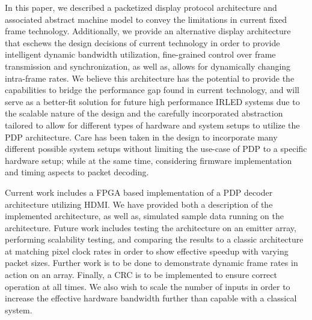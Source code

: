 \label{chap:conclusion}
In this paper, we described a packetized display protocol architecture and associated abstract machine model to convey the limitations in current fixed frame technology. Additionally, we provide an alternative display architecture that eschews the design decisions of current technology in order to provide intelligent dynamic bandwidth utilization, fine-grained control over frame transmission and synchronization, as well as, allows for dynamically changing intra-frame rates. We believe this architecture has the potential to provide the capabilities to bridge the performance gap found in current technology, and will serve as a better-fit solution for future high performance IRLED systems due to the scalable nature of the design and the carefully incorporated abstraction tailored to allow for different types of hardware and system setups to utilize the PDP architecture. Care has been taken in the design to incorporate many different possible system setups without limiting the use-case of PDP to a specific hardware setup; while at the same time, considering firmware implementation and timing aspects to packet decoding.

Current work includes a FPGA based implementation of a PDP decoder architecture utilizing HDMI. We have provided both a description of the implemented architecture, as well as, simulated sample data running on the architecture. Future work includes testing the architecture on an emitter array, performing scalability testing, and comparing the results to a classic architecture at matching pixel clock rates in order to show effective speedup with varying packet sizes. Further work is to be done to demonstrate dynamic frame rates in action on an array. Finally, a CRC is to be implemented to ensure correct operation at all times. We also wish to scale the number of inputs in order to increase the effective hardware bandwidth further than capable with a classical system.
